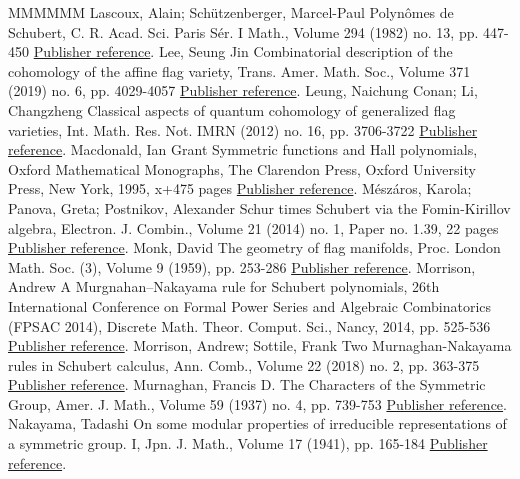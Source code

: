 \documentclass[11pt]{article}
\theoremstyle{definition}
\numberwithin{equation}{section}
\begin{document}
\begin{thebibliography}{MMMMMM}
 Lascoux, Alain; Schützenberger, Marcel-Paul Polynômes de Schubert, C. R. Acad. Sci. Paris Sér. I Math., Volume 294 (1982) no. 13, pp. 447-450 \href{https://alco.centre-mersenne.org/articles/10.5802/alco.427/#LaSch82}{Publisher reference}.
 Lee, Seung Jin Combinatorial description of the cohomology of the affine flag variety, Trans. Amer. Math. Soc., Volume 371 (2019) no. 6, pp. 4029-4057 \href{https://alco.centre-mersenne.org/articles/10.5802/alco.427/#Lee}{Publisher reference}.
 Leung, Naichung Conan; Li, Changzheng Classical aspects of quantum cohomology of generalized flag varieties, Int. Math. Res. Not. IMRN (2012) no. 16, pp. 3706-3722 \href{https://alco.centre-mersenne.org/articles/10.5802/alco.427/#LeungLi2012}{Publisher reference}.
 Macdonald, Ian Grant Symmetric functions and Hall polynomials, Oxford Mathematical Monographs, The Clarendon Press, Oxford University Press, New York, 1995, x+475 pages \href{https://alco.centre-mersenne.org/articles/10.5802/alco.427/#Macdonald}{Publisher reference}.
 Mészáros, Karola; Panova, Greta; Postnikov, Alexander Schur times Schubert via the Fomin-Kirillov algebra, Electron. J. Combin., Volume 21 (2014) no. 1, Paper no. 1.39, 22 pages \href{https://alco.centre-mersenne.org/articles/10.5802/alco.427/#MPP}{Publisher reference}.
 Monk, David The geometry of flag manifolds, Proc. London Math. Soc. (3), Volume 9 (1959), pp. 253-286 \href{https://alco.centre-mersenne.org/articles/10.5802/alco.427/#Monk}{Publisher reference}.
 Morrison, Andrew A Murgnahan–Nakayama rule for Schubert polynomials, 26th International Conference on Formal Power Series and Algebraic Combinatorics (FPSAC 2014), Discrete Math. Theor. Comput. Sci., Nancy, 2014, pp. 525-536 \href{https://alco.centre-mersenne.org/articles/10.5802/alco.427/#Morrison}{Publisher reference}.
 Morrison, Andrew; Sottile, Frank Two Murnaghan-Nakayama rules in Schubert calculus, Ann. Comb., Volume 22 (2018) no. 2, pp. 363-375 \href{https://alco.centre-mersenne.org/articles/10.5802/alco.427/#MorrisonSottile}{Publisher reference}.
 Murnaghan, Francis D. The Characters of the Symmetric Group, Amer. J. Math., Volume 59 (1937) no. 4, pp. 739-753 \href{https://alco.centre-mersenne.org/articles/10.5802/alco.427/#Mu37}{Publisher reference}.
 Nakayama, Tadashi On some modular properties of irreducible representations of a symmetric group. I, Jpn. J. Math., Volume 17 (1941), pp. 165-184 \href{https://alco.centre-mersenne.org/articles/10.5802/alco.427/#Na41a}{Publisher reference}.

\end{thebibliography}
\end{document}
